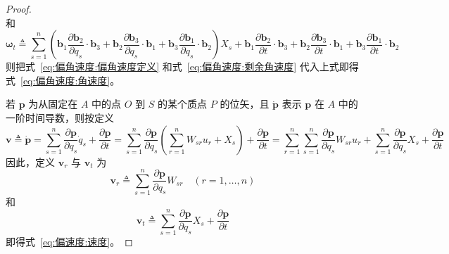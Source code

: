 \begin{proof}
\begin{equation}
        \label{eq:偏角速度:偏角速度定义}
    \end{equation}
    和
    \begin{equation}
        \bm{\omega}_t \triangleq \sum_{s=1}^{n}\left(\mathbf{b}_1\frac{\partial\mathbf{b}_2}{\partial q_s}\cdot\mathbf{b}_3 + \mathbf{b}_2\frac{\partial\mathbf{b}_3}{\partial q_s}\cdot\mathbf{b}_1 + \mathbf{b}_3\frac{\partial\mathbf{b}_1}{\partial q_s}\cdot\mathbf{b}_2\right)X_s
        + \mathbf{b}_1\frac{\partial\mathbf{b}_2}{\partial t}\cdot\mathbf{b}_3 + \mathbf{b}_2\frac{\partial\mathbf{b}_3}{\partial t}\cdot\mathbf{b}_1 + \mathbf{b}_3\frac{\partial\mathbf{b}_1}{\partial t}\cdot\mathbf{b}_2
        \label{eq:偏角速度:剩余角速度}
    \end{equation}
    则把式~\eqref{eq:偏角速度:偏角速度定义} 和式~\eqref{eq:偏角速度:剩余角速度} 代入上式即得式~\eqref{eq:偏角速度:角速度}。

    若 $\mathbf{p}$ 为从固定在 $A$ 中的点 $O$ 到 $S$ 的某个质点 $P$ 的位矢，且 $\dot{\mathbf{p}}$ 表示 $\mathbf{p}$ 在 $A$ 中的一阶时间导数，则按定义
    \begin{equation}
        \mathbf{v} \triangleq \dot{\mathbf{p}} = \sum_{s=1}^{n}\frac{\partial\mathbf{p}}{\partial q_s}\dot{q}_s + \frac{\partial\mathbf{p}}{\partial t}
        = \sum_{s=1}^{n}\frac{\partial\mathbf{p}}{\partial q_s}\left(\sum_{r=1}^{n}W_{sr}u_r+X_s\right) + \frac{\partial\mathbf{p}}{\partial t}
        = \sum_{r=1}^{n}\sum_{s=1}^{n}\frac{\partial\mathbf{p}}{\partial q_s}W_{sr}u_r + \sum_{s=1}^{n}\frac{\partial\mathbf{p}}{\partial q_s}X_s + \frac{\partial\mathbf{p}}{\partial t}
    \end{equation}
    因此，定义 $\mathbf{v}_r$ 与 $\mathbf{v}_t$ 为
    \begin{equation}
        \mathbf{v}_r \triangleq \sum_{s=1}^{n}\frac{\partial\mathbf{p}}{\partial q_s}W_{sr} \quad (r=1,\dots,n)
        \label{eq:偏速度:偏速度定义}
    \end{equation}
    和
    \begin{equation}
        \mathbf{v}_t \triangleq \sum_{s=1}^{n}\frac{\partial\mathbf{p}}{\partial q_s}X_s + \frac{\partial\mathbf{p}}{\partial t}
        \label{eq:偏速度:剩余速度}
    \end{equation}
    即得式~\eqref{eq:偏速度:速度}。
\end{proof}

